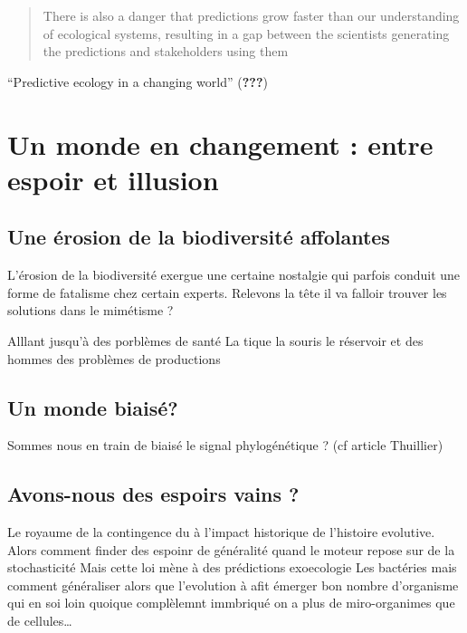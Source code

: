 \begin{quote}
There is also a danger that predictions grow faster than our
understanding of ecological systems, resulting in a gap between the
scientists generating the predictions and stakeholders using them
\end{quote}

``Predictive ecology in a changing world'' ({\textbf{???}})

\section*{Un monde en changement : entre espoir et
illusion}\label{un-monde-en-changement-entre-espoir-et-illusion}

\subsection*{Une érosion de la biodiversité
affolantes}\label{une-uxe9rosion-de-la-biodiversituxe9-affolantes}

L'érosion de la biodiversité exergue une certaine nostalgie qui parfois
conduit une forme de fatalisme chez certain experts. Relevons la tête il
va falloir trouver les solutions dans le mimétisme ?

Alllant jusqu'à des porblèmes de santé La tique la souris le réservoir
et des hommes des problèmes de productions

\subsection*{Un monde biaisé?}\label{un-monde-biaisuxe9}

Sommes nous en train de biaisé le signal phylogénétique ? (cf article
Thuillier)

\subsection{Avons-nous des espoirs vains
?}\label{avons-nous-des-espoirs-vains}

Le royaume de la contingence du à l'impact historique de l'histoire
evolutive. Alors comment finder des espoinr de généralité quand le
moteur repose sur de la stochasticité Mais cette loi mène à des
prédictions exoecologie Les bactéries mais comment généraliser alors que
l'evolution à afit émerger bon nombre d'organisme qui en soi loin
quoique complèlemnt immbriqué on a plus de miro-organimes que de
cellules\ldots{}

